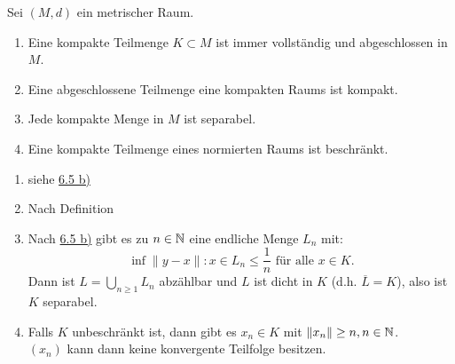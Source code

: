 \begin{prop} \label{prop:6.6}
	Sei $(M, d)$ ein metrischer Raum.
	\begin{enumerate}[label=\alph*\upshape)]
		\item Eine kompakte Teilmenge $K \subset M$ ist immer vollständig und abgeschlossen in $M$.
		\item Eine abgeschlossene Teilmenge eine kompakten Raums ist kompakt.
		\item Jede kompakte Menge in $M$ ist separabel.
		\item Eine kompakte Teilmenge eines normierten Raums ist beschränkt.
	\end{enumerate}
	\begin{beweis}
		\begin{enumerate}[label=\alph*\upshape)]
			\item siehe \hyperref[satz:6.5b]{6.5 b)}
			\item Nach Definition
			\item Nach \hyperref[satz:6.5b]{6.5 b)} gibt es zu $n \in \mathbb{N}$ eine endliche Menge $L_{n}$ mit:
				\[ \inf{\| y - x \| : x \in L_{n}} \leq \frac{1}{n} \text{ für alle } x \in K. \]
				Dann ist $L = \bigcup_{n \geq 1} L_{n}$ abzählbar und $L$ ist dicht in $K$ (d.h. $\overline{L} = K$), also ist $K$ separabel.
			\item Falls $K$ unbeschränkt ist, dann gibt es $x_{n} \in K$ mit $\|x_{n}\| \geq n, n \in \mathbb{N}$. \\
				$(x_{n})$ kann dann keine konvergente Teilfolge besitzen.
		\end{enumerate}
	\end{beweis}

\end{prop}

